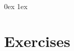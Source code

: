 \clearpage
\fancyhfoffset{0mm}
\parindent 0ex
\parskip 1ex

\section{Exercises}












\clearpage
{}
\printindex



